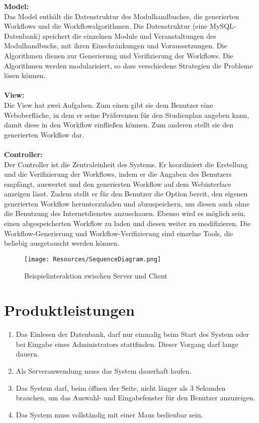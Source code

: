 \documentclass[parskip=full]{scrartcl}
\def\threedigits#1{%
	\ifnum#1<10 0\fi 
	\number#1}
\begin{document}
		\textbf{Model:}\\
		Das Model enthält die Datenstruktur des Modulhandbuches, die generierten Workflows und die Workflowalgorithmen. Die Datenstruktur (eine MySQL-Datenbank) speichert die einzelnen Module und Veranstaltungen des Modulhandbuchs, mit ihren Einschränkungen und Voraussetzungen. Die Algorithmen dienen zur Generierung und Verifizierung der Workflows. Die Algorithmen werden modularisiert, so dass verschiedene Strategien die Probleme lösen können.
		\\ \\
		
		\textbf{View:}\\
		Die View hat zwei Aufgaben. Zum einen gibt sie dem Benutzer eine Weboberfläche, in dem er seine Präferenzen für den Studienplan angeben kann, damit diese in den Workflow einfließen können. Zum anderen stellt sie den generierten Workflow dar.
		\\ \\
		
		\textbf{Controller:}\\
		Der Controller ist die Zentraleinheit des Systems. Er koordiniert die Erstellung und die Verifizierung der Workflows, indem er die Angaben des Benutzers empfängt, auswertet und den generierten Workflow auf dem Webinterface anzeigen lässt. Zudem stellt er für den Benutzer die Option bereit, den eigenen generierten Workflow herunterzuladen und abzuspeichern, um diesen auch ohne die Benutzung des Internetdienstes anzuschauen. Ebenso wird es möglich sein, einen abgespeicherten Workflow zu laden und diesen weiter zu modifizieren. Die Workflow-Generierung und Workflow-Verifizierung sind einzelne Tools, die beliebig ausgetauscht werden können.
	
		\begin{figure}
			\texttt{[image: Resources/SequenceDiagram.png]}
			\caption{Beispielinteraktion zwischen Server und Client}
			\label{fig:server_client_interaction}
		\end{figure}
	
	\section{Produktleistungen}
	
		\begin{enumerate}[label=/L\protect\threedigits{\theenumi}0/]
			\item Das Einlesen der Datenbank, darf nur einmalig beim Start des System oder bei Eingabe eines Administrators stattfinden. Dieser Vorgang darf lange dauern.
			\item Als Serveranwendung muss das System dauerhaft laufen.
			\item Das System darf, beim öffnen der Seite, nicht länger als 3 Sekunden brauchen, um das Auswahl- und Eingabefenster für den Benutzer anzuzeigen.
			\item Das System muss vollständig mit einer Maus bedienbar sein. 
		\end{enumerate}
	
\end{document}
